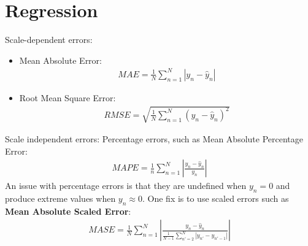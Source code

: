 \documentclass{report}
\newcommand{\tbf}{\textbf}
\newcommand{\yhat}{\hat{y}}
\begin{document}
\section{Regression}
Scale-dependent errors:
\begin{itemize}
 \item Mean Absolute Error:
 \begin{align}
  MAE = \frac{1}{N}\sum_{n=1}^N |y_n - \yhat_n|
 \end{align}
 \item Root Mean Square Error:
 \begin{align}
  RMSE = \sqrt{\frac{1}{N}\sum_{n=1}^N (y_n - \yhat_n)^2}
 \end{align}
\end{itemize}
Scale independent errors: Percentage errors, such as Mean Absolute Percentage Error:
\begin{align}
 MAPE = \frac{1}{n}\sum_{n=1}^N \left|\frac{y_n - \yhat_n}{y_n}\right|
\end{align}
An issue with percentage errors is that they are undefined when $y_n = 0$ and produce extreme values when $y_n \approx 0$. One fix is to use scaled errors such as \tbf{Mean Absolute Scaled Error}:
\begin{align}
 MASE = \frac{1}{N} \sum_{n=1}^N \left|\frac{y_n - \yhat_n}{\frac{1}{N-1}\sum_{n'=2}^N |y_{n'} - y_{n'-1}|}\right|
\end{align}
\end{document}
